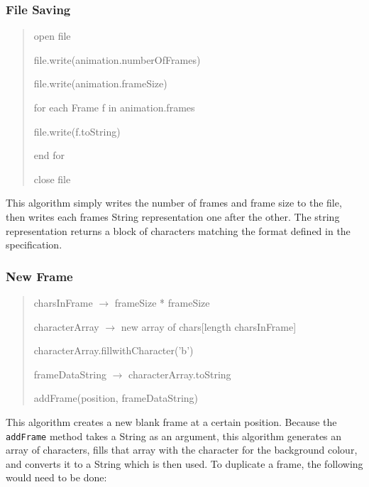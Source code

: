 \documentclass[a4paper, 11pt]{article}
\begin{document}
\subsubsection{File Saving}

\begin{quotation}
\begin{tt}

open file \par
file.write(animation.numberOfFrames) \par
file.write(animation.frameSize) \par
for each Frame f in animation.frames \par
{\addtolength{\leftskip}{5mm} file.write(f.toString) \par}
end for \par
close file \par

\end{tt}
\end{quotation}

This algorithm simply writes the number of frames and frame size to the file, then writes each frames String representation one after the other. The string representation returns a block of characters matching the format defined in the specification.

\subsubsection{New Frame}

\begin{quotation}
\begin{tt}

charsInFrame $\rightarrow$ frameSize * frameSize \par
characterArray $\rightarrow$ new array of chars[length charsInFrame]\par
characterArray.fillwithCharacter('b') \par
frameDataString $\rightarrow$ characterArray.toString \par
addFrame(position, frameDataString) \par

\end{tt}
\end{quotation}

This algorithm creates a new blank frame at a certain position. Because the \texttt{addFrame} method takes a String as an argument, this algorithm generates an array of characters, fills that array with the character for the background colour, and converts it to a String which is then used. To duplicate a frame, the following would need to be done:
\end{document}
